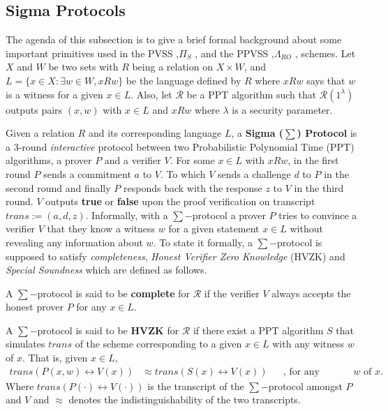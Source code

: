\subsection{Sigma Protocols}
\label{sec:sigma-protocols}
The agenda of this subsection is to give a brief formal background about some important primitives 
used in the PVSS ,$\Pi_S$ \cite{cryptoeprint:2023/1669}, and the PPVSS ,$\Lambda_{RO}$ \cite{cryptoeprint:2025/576}, schemes.
Let $X$ and $W$ be two sets with $R$ being a relation on $X\times W$, and $L=\{x\in X :\exists w\in W, xRw\}$
be the language defined by $R$ where $xRw$ says that $w$ is a witness for a given $x\in L$. 
Also, let $\mathcal{R}$ be a PPT algorithm such that $\mathcal{R}(1^\lambda)$ outputs pairs 
$(x,w)$ with $x\in L$ and $xRw$ where $\lambda$ is a security parameter.\par

Given a relation $R$ and its corresponding language $L$, a \textbf{Sigma ($\sum$) Protocol} 
is a $3$-round \textit{interactive} protocol between two Probabilistic Polynomial Time (PPT) algorithms, 
a prover $P$ 
and a verifier $V$. For some $x\in L$ with $xRw$, in the first round $P$ sends a 
commitment $a$ to $V$. To which $V$ sends a challenge $d$ to $P$ in the second round 
and finally $P$ responds back with the response $z$ to $V$ in the third round. 
$V$ outputs \textbf{true} or \textbf{false} upon the proof verification on transcript
$trans := (a, d, z)$. 
Informally, with a $\sum-$protocol a prover $P$ tries to convince
a verifier $V$ that they know a witness $w$ for a given statement $x\in L$ without 
revealing any information about $w$. To state it formally, a $\sum-$protocol is 
supposed to satisfy \textit{completeness}, \textit{Honest Verifier Zero Knowledge} (HVZK)
and \textit{Special Soundness} which are defined as follows.

\begin{definition}[Completeness]
  A $\sum-$protocol is said to be \textbf{complete} for $\mathcal{R}$ if
  the verifier $V$ always accepts the honest prover $P$ for any $x\in L$.
\end{definition}

\begin{definition}[HVZK]
  A $\sum-$protocol is said to be \textbf{HVZK} for $\mathcal{R}$ if there exist a PPT algorithm $S$ 
  that simulates $trans$ of the scheme corresponding to a given $x\in L$ with any witness $w$ of $x$. 
  That is, given $x\in L$,
  \begin{align*}
    trans(P(x,w)\leftrightarrow V(x)) &\approx trans(S(x) \leftrightarrow V(x))&& \text{, for any witness $w$ of $x$.}
  \end{align*}
  Where $trans(P(\cdot)\leftrightarrow V(\cdot))$ is the transcript of the $\sum-$protocol amongst 
  $P$ and $V$ and $\approx$ denotes the indistinguishability of the two transcripts.
\end{definition}

